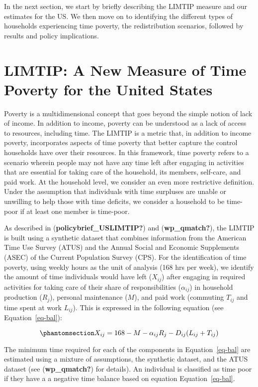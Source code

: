 \documentclass[
  11pt,
]{article}
\begin{document}
In the next section, we start by briefly describing the LIMTIP measure
and our estimates for the US. We then move on to identifying the
different types of households experiencing time poverty, the
redistribution scenarios, followed by results and policy implications.

\section{LIMTIP: A New Measure of Time Poverty for the United
States}\label{limtip-a-new-measure-of-time-poverty-for-the-united-states}

Poverty is a multidimensional concept that goes beyond the simple notion
of lack of income. In addition to income, poverty can be understood as a
lack of access to resources, including time. The LIMTIP is a metric
that, in addition to income poverty, incorporates aspects of time
poverty that better capture the control households have over their
resources. In this framework, time poverty refers to a scenario wherein
people may not have any time left after engaging in activities that are
essential for taking care of the household, its members, self-care, and
paid work. At the household level, we consider an even more restrictive
definition. Under the assumption that individuals with time surpluses
are unable or unwilling to help those with time deficits, we consider a
household to be time-poor if at least one member is time-poor.

As described in (\textbf{policybrief\_USLIMTIP?}) and
(\textbf{wp\_qmatch?}), the LIMTIP is built using a synthetic dataset
that combines information from the American Time Use Survey (ATUS) and
the Annual Social and Economic Supplements (ASEC) of the Current
Population Survey (CPS). For the identification of time poverty, using
weekly hours as the unit of analysis (168 hrs per week), we identify the
amount of time individuals would have left (\(X_{ij}\)) after engaging
in required activities for taking care of their share of
responsibilities (\(\alpha_{ij}\)) in household production (\(R_j\)),
personal maintenance (\(M\)), and paid work (commuting \(T_{ij}\) and
time spent at work \(L_{ij}\)). This is expressed in the following
equation (see Equation~\ref{eq-bal}):

\begin{equation}\phantomsection\label{eq-bal}{X_{ij} = 168 - M - \alpha_{ij}R_j-D_{ij}(L_{ij}+T_{ij})
}\end{equation}

The minimum time required for each of the components in
Equation~\ref{eq-bal} are estimated using a mixture of assumptions, the
synthetic dataset, and the ATUS dataset (see (\textbf{wp\_qmatch?}) for
details). An individual is classified as time poor if they have a a
negative time balance based on equation Equation~\ref{eq-bal}.
\end{document}
